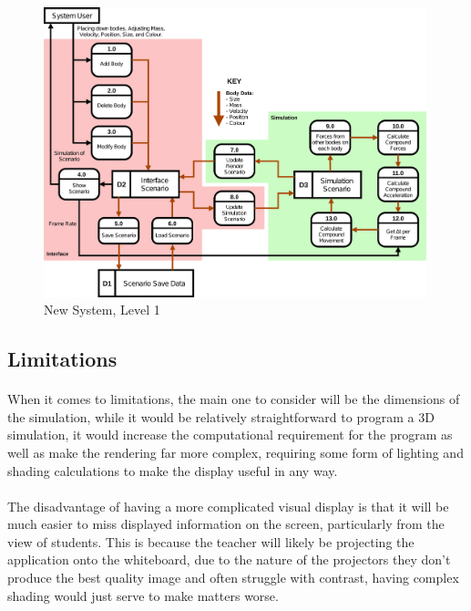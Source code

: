 \begin{figure}[!ht]
  \centering
  \includegraphics[angle=-90, width=0.99\textwidth]{img/nsl1.png}
  \caption{New System, Level 1}
\end{figure}

\subsection{Limitations}
\paragraph{}
When it comes to limitations, the main one to consider will be the dimensions of the simulation, while it would be relatively straightforward to program a 3D simulation, it would increase the computational requirement for the program as well as make the rendering far more complex, requiring some form of lighting and shading calculations to make the display useful in any way.

\paragraph{}
The disadvantage of having a more complicated visual display is that it will be much easier to miss displayed information on the screen, particularly from the view of students. This is because the teacher will likely be projecting the application onto the whiteboard, due to the nature of the projectors they don't produce the best quality image and often struggle with contrast, having complex shading would just serve to make matters worse.

